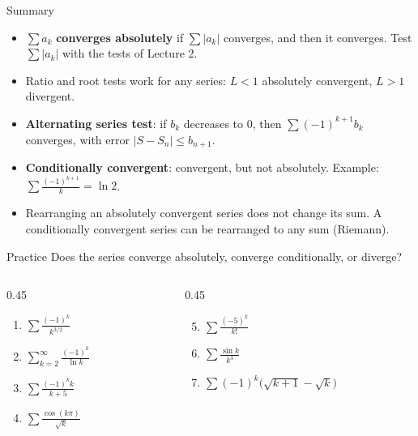 \documentclass{wosm-slides}
\begin{document}
\begin{frame}{Summary}
  \begin{itemize}
    \item $\sum a_k$ \textbf{converges absolutely} if $\sum |a_k|$ converges, and then it
      converges. Test $\sum |a_k|$ with the tests of Lecture 2.
    \item Ratio and root tests work for any series: $L < 1$ absolutely convergent,
      $L > 1$ divergent.
    \item \textbf{Alternating series test}: if $b_k$ decreases to $0$, then
      $\sum (-1)^{k+1} b_k$ converges, with error $|S - S_n| \le b_{n+1}$.
    \item \textbf{Conditionally convergent}: convergent, but not absolutely. Example:
      $\sum \frac{(-1)^{k+1}}{k} = \ln 2$.
    \item Rearranging an absolutely convergent series does not change its sum.
      A conditionally convergent series can be rearranged to any sum (Riemann).
  \end{itemize}
\end{frame}

\begin{frame}{Practice}
  Does the series converge absolutely, converge conditionally, or diverge?
  \begin{columns}[T]
    \begin{column}{0.45\textwidth}
      \begin{enumerate}
        \item $\displaystyle\sum \frac{(-1)^k}{k^{3/2}}$
        \item $\displaystyle\sum_{k=2}^\infty \frac{(-1)^k}{\ln k}$
        \item $\displaystyle\sum \frac{(-1)^k k}{k + 5}$
        \item $\displaystyle\sum \frac{\cos(k\pi)}{\sqrt{k}}$
      \end{enumerate}
    \end{column}
    \begin{column}{0.45\textwidth}
      \begin{enumerate}
        \setcounter{enumi}{4}
        \item $\displaystyle\sum \frac{(-5)^k}{k!}$
        \item $\displaystyle\sum \frac{\sin k}{k^3}$
        \item $\displaystyle\sum (-1)^k \bigl(\sqrt{k+1} - \sqrt{k}\bigr)$
      \end{enumerate}
    \end{column}
  \end{columns}
\end{frame}
\end{document}
